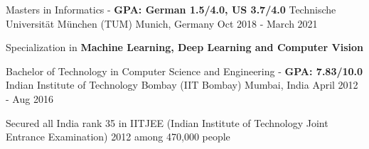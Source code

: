 \begin{cventries}
	\cventry
	{Masters in Informatics - \textbf{GPA: German 1.5/4.0, US 3.7/4.0}} %
	{Technische Universität München (TUM)} %
	{Munich, Germany} %
	{Oct 2018 - March 2021} %
	{
		\begin{cvitems}
			\item {Specialization in \textbf{Machine Learning, Deep Learning and Computer Vision}}
		\end{cvitems}
    }
  	\cventry
    {Bachelor of Technology in Computer Science and Engineering - \textbf{GPA: 7.83/10.0}} %
    {Indian Institute of Technology Bombay (IIT Bombay)} %
    {Mumbai, India} %
    {April 2012 - Aug 2016} %
    {
		\begin{cvitems}
			\item {Secured all India rank 35 in IITJEE (Indian Institute of Technology Joint Entrance Examination) 2012 among 470,000 people}
		\end{cvitems}
    }
\end{cventries}
